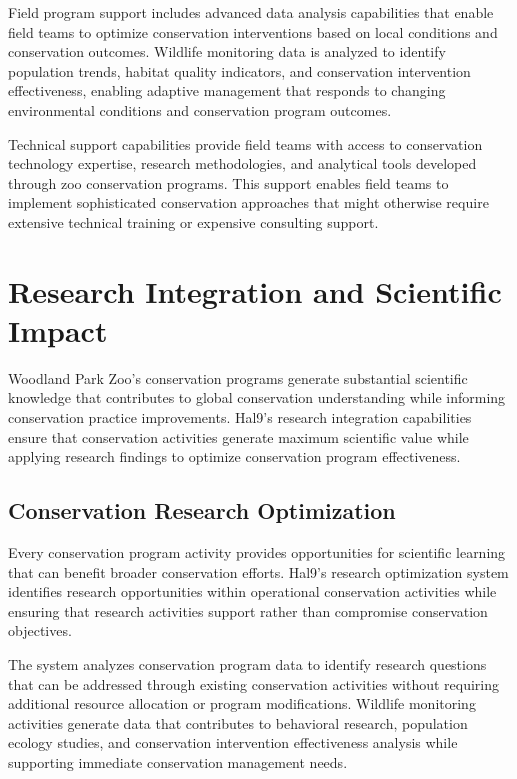 \documentclass[
  Letterpaper,
]{scrbook}
\begin{document}
Field program support includes advanced data analysis capabilities that
enable field teams to optimize conservation interventions based on local
conditions and conservation outcomes. Wildlife monitoring data is
analyzed to identify population trends, habitat quality indicators, and
conservation intervention effectiveness, enabling adaptive management
that responds to changing environmental conditions and conservation
program outcomes.

Technical support capabilities provide field teams with access to
conservation technology expertise, research methodologies, and
analytical tools developed through zoo conservation programs. This
support enables field teams to implement sophisticated conservation
approaches that might otherwise require extensive technical training or
expensive consulting support.

\section{Research Integration and Scientific
Impact}\label{research-integration-and-scientific-impact}

Woodland Park Zoo's conservation programs generate substantial
scientific knowledge that contributes to global conservation
understanding while informing conservation practice improvements. Hal9's
research integration capabilities ensure that conservation activities
generate maximum scientific value while applying research findings to
optimize conservation program effectiveness.

\subsection{Conservation Research
Optimization}\label{conservation-research-optimization}

Every conservation program activity provides opportunities for
scientific learning that can benefit broader conservation efforts.
Hal9's research optimization system identifies research opportunities
within operational conservation activities while ensuring that research
activities support rather than compromise conservation objectives.

The system analyzes conservation program data to identify research
questions that can be addressed through existing conservation activities
without requiring additional resource allocation or program
modifications. Wildlife monitoring activities generate data that
contributes to behavioral research, population ecology studies, and
conservation intervention effectiveness analysis while supporting
immediate conservation management needs.
\end{document}
